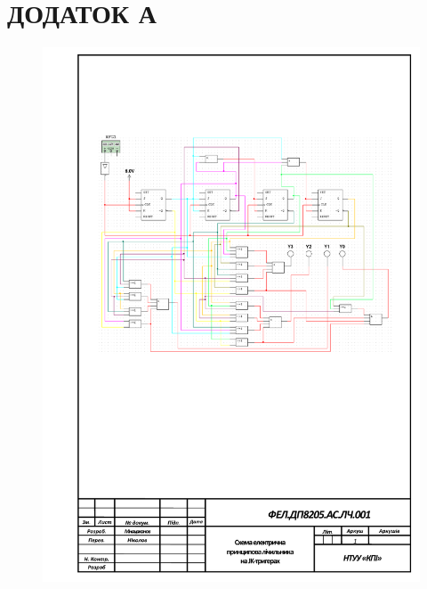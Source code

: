 \documentclass[a4paper,14pt]{extreport}
\begin{document}
\chapter{   ДОДАТОК А  }
 


\begin{figure}[h!]
\includegraphics[width=1.0\linewidth]{sx.pdf}
\end{figure}
\end{document}
